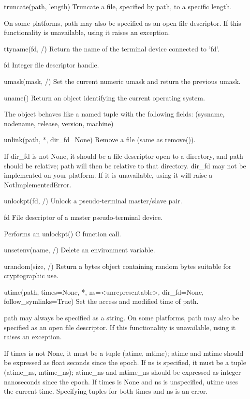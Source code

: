\documentclass{article}
\begin{document}
    truncate(path, length)
        Truncate a file, specified by path, to a specific length.

        On some platforms, path may also be specified as an open file descriptor.
          If this functionality is unavailable, using it raises an exception.

    ttyname(fd, /)
        Return the name of the terminal device connected to 'fd'.

        fd
          Integer file descriptor handle.

    umask(mask, /)
        Set the current numeric umask and return the previous umask.

    uname()
        Return an object identifying the current operating system.

        The object behaves like a named tuple with the following fields:
          (sysname, nodename, release, version, machine)

    unlink(path, *, dir_fd=None)
        Remove a file (same as remove()).

        If dir_fd is not None, it should be a file descriptor open to a directory,
          and path should be relative; path will then be relative to that directory.
        dir_fd may not be implemented on your platform.
          If it is unavailable, using it will raise a NotImplementedError.

    unlockpt(fd, /)
        Unlock a pseudo-terminal master/slave pair.

          fd
            File descriptor of a master pseudo-terminal device.

        Performs an unlockpt() C function call.

    unsetenv(name, /)
        Delete an environment variable.

    urandom(size, /)
        Return a bytes object containing random bytes suitable for cryptographic use.

    utime(path, times=None, *, ns=<unrepresentable>,
          dir_fd=None, follow_symlinks=True)
        Set the access and modified time of path.

        path may always be specified as a string.
        On some platforms, path may also be specified as an open file descriptor.
          If this functionality is unavailable, using it raises an exception.

        If times is not None, it must be a tuple (atime, mtime);
            atime and mtime should be expressed as float seconds since the epoch.
        If ns is specified, it must be a tuple (atime_ns, mtime_ns);
            atime_ns and mtime_ns should be expressed as integer nanoseconds
            since the epoch.
        If times is None and ns is unspecified, utime uses the current time.
        Specifying tuples for both times and ns is an error.
\end{document}
